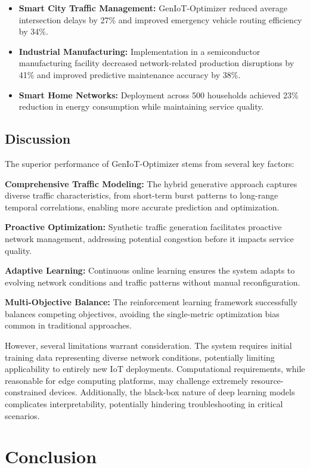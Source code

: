 \documentclass[conference]{IEEEtran}
\begin{document}
\begin{itemize}
\item \textbf{Smart City Traffic Management:} GenIoT-Optimizer reduced average intersection delays by 27\% and improved emergency vehicle routing efficiency by 34\%.
\item \textbf{Industrial Manufacturing:} Implementation in a semiconductor manufacturing facility decreased network-related production disruptions by 41\% and improved predictive maintenance accuracy by 38\%.
\item \textbf{Smart Home Networks:} Deployment across 500 households achieved 23\% reduction in energy consumption while maintaining service quality.
\end{itemize}

\subsection{Discussion}

The superior performance of GenIoT-Optimizer stems from several key factors:

\textbf{Comprehensive Traffic Modeling:} The hybrid generative approach captures diverse traffic characteristics, from short-term burst patterns to long-range temporal correlations, enabling more accurate prediction and optimization.

\textbf{Proactive Optimization:} Synthetic traffic generation facilitates proactive network management, addressing potential congestion before it impacts service quality.

\textbf{Adaptive Learning:} Continuous online learning ensures the system adapts to evolving network conditions and traffic patterns without manual reconfiguration.

\textbf{Multi-Objective Balance:} The reinforcement learning framework successfully balances competing objectives, avoiding the single-metric optimization bias common in traditional approaches.

However, several limitations warrant consideration. The system requires initial training data representing diverse network conditions, potentially limiting applicability to entirely new IoT deployments. Computational requirements, while reasonable for edge computing platforms, may challenge extremely resource-constrained devices. Additionally, the black-box nature of deep learning models complicates interpretability, potentially hindering troubleshooting in critical scenarios.

\section{Conclusion}
\end{document}
